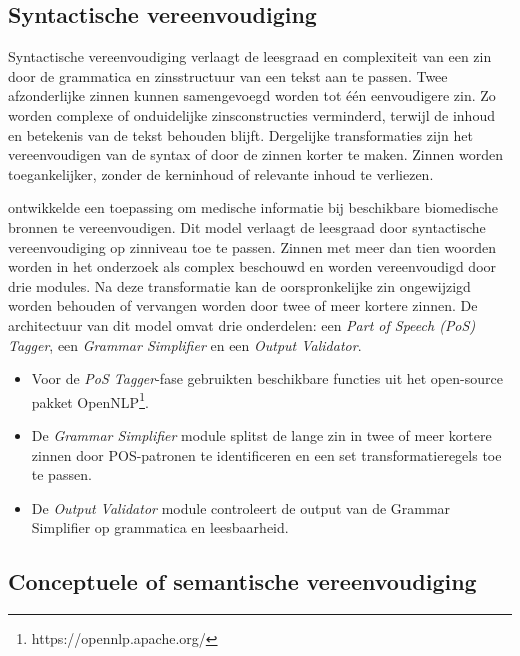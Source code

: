 

\subsection{Syntactische vereenvoudiging}

Syntactische vereenvoudiging verlaagt de leesgraad en complexiteit van een zin door de grammatica en zinsstructuur van een tekst aan te passen. Twee afzonderlijke zinnen kunnen samengevoegd worden tot één eenvoudigere zin. Zo worden complexe of onduidelijke zinsconstructies verminderd, terwijl de inhoud en betekenis van de tekst behouden blijft. Dergelijke transformaties zijn het vereenvoudigen van de syntax of door de zinnen korter te maken. Zinnen worden toegankelijker, zonder de kerninhoud of relevante inhoud te verliezen.

\textcite{Kandula2010} ontwikkelde een toepassing om medische informatie bij beschikbare biomedische bronnen te vereenvoudigen. Dit model verlaagt de leesgraad door syntactische vereenvoudiging op zinniveau toe te passen. Zinnen met meer dan tien woorden worden in het onderzoek als complex beschouwd en worden vereenvoudigd door drie modules. Na deze transformatie kan de oorspronkelijke zin ongewijzigd worden behouden of vervangen worden door twee of meer kortere zinnen. De architectuur van dit model omvat drie onderdelen: een \textit{Part of Speech (PoS) Tagger}, een \textit{Grammar Simplifier} en een \textit{Output Validator}. 

\begin{itemize}
	\item Voor de \textit{PoS Tagger}-fase gebruikten \textcite{Kandula2010} beschikbare functies uit het open-source pakket OpenNLP\footnote{https://opennlp.apache.org/}.
	\item De \textit{Grammar Simplifier} module splitst de lange zin in twee of meer kortere zinnen door POS-patronen te identificeren en een set transformatieregels toe te passen.
	\item De \textit{Output Validator} module controleert de output van de Grammar Simplifier op grammatica en leesbaarheid.
\end{itemize}  


\subsection{Conceptuele of semantische vereenvoudiging}

